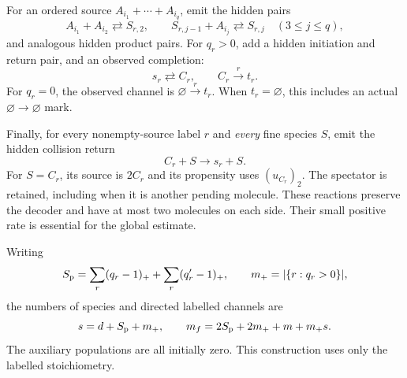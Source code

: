 \documentclass[11pt,reqno]{amsart}
\theoremstyle{definition}
\theoremstyle{remark}
\begin{document}
For an ordered source $A_{i_1}+\cdots+A_{i_q}$, emit the hidden pairs
\begin{equation}\label{eq:prefix-reactions}
 A_{i_1}+A_{i_2}\rightleftarrows S_{r,2},\qquad
 S_{r,j-1}+A_{i_j}\rightleftarrows S_{r,j}\quad(3\le j\le q),
\end{equation}
and analogous hidden product pairs. For $q_r>0$, add a hidden initiation and
return pair, and an observed completion:
\begin{equation}\label{eq:pending-reactions}
 s_r\rightleftarrows C_r,\qquad C_r\xrightarrow{r}t_r.
\end{equation}
For $q_r=0$, the observed channel is $\varnothing\xrightarrow{r}t_r$.
When $t_r=\varnothing$, this includes an actual $\varnothing\to\varnothing$
mark.

Finally, for every nonempty-source label $r$ and \emph{every} fine species $S$,
emit the hidden collision return
\begin{equation}\label{eq:collision}
 C_r+S\longrightarrow s_r+S.
\end{equation}
For $S=C_r$, its source is $2C_r$ and its propensity uses $(u_{C_r})_2$.
The spectator is retained, including when it is another pending molecule.
These reactions preserve the decoder and have at most two molecules on each
side. Their small positive rate is essential for the global estimate.

Writing
\[
 S_{\rm p}=\sum_r(q_r-1)_++\sum_r(q'_r-1)_+,
 \qquad m_+=|\{r:q_r>0\}|,
\]
the numbers of species and directed labelled channels are
\begin{equation}\label{eq:network-size}
 s=d+S_{\rm p}+m_+,\qquad
 m_f=2S_{\rm p}+2m_++m+m_+s.
\end{equation}
The auxiliary populations are all initially zero. This construction uses only
the labelled stoichiometry.
\end{document}
